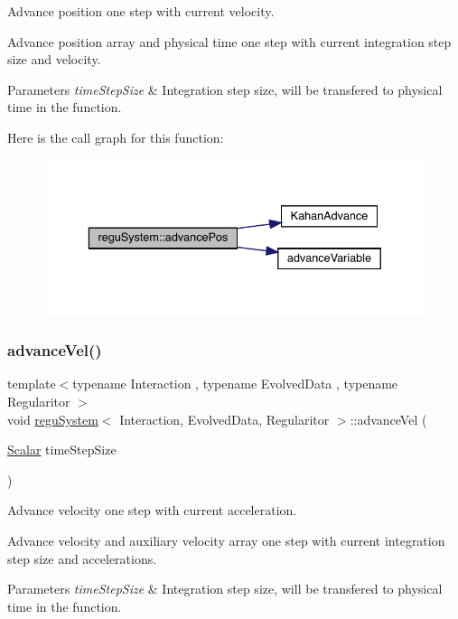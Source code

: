 Advance position one step with current velocity. 

Advance position array and physical time one step with current integration step size and velocity. 
\begin{DoxyParams}{Parameters}
{\em time\+Step\+Size} & Integration step size, will be transfered to physical time in the function. \\
\hline
\end{DoxyParams}
Here is the call graph for this function\+:
\nopagebreak
\begin{figure}[H]
\begin{center}
\leavevmode
\includegraphics[width=336pt]{classregu_system_ab1964e22d3d7f6ddaa51c5e7a02534a5_cgraph}
\end{center}
\end{figure}
\mbox{\label{classregu_system_ae00564e4aceeec7ce3a8aa6a158aa53e}} 
\subsubsection{\texorpdfstring{advance\+Vel()}{advanceVel()}}
{\footnotesize\ttfamily template$<$typename Interaction , typename Evolved\+Data , typename Regularitor $>$ \\
void \mbox{\hyperlink{classregu_system}{regu\+System}}$<$ Interaction, Evolved\+Data, Regularitor $>$\+::advance\+Vel (\begin{DoxyParamCaption}\item[{\mbox{\hyperlink{classregu_system_aca8ee2c387943164ee3ea68370fc3ac0}{Scalar}}}]{time\+Step\+Size }\end{DoxyParamCaption})}



Advance velocity one step with current acceleration. 

Advance velocity and auxiliary velocity array one step with current integration step size and accelerations. 
\begin{DoxyParams}{Parameters}
{\em time\+Step\+Size} & Integration step size, will be transfered to physical time in the function. \\
\hline
\end{DoxyParams}
\mbox{\label{classregu_system_a53e1d725a1df2b65029f622a17364b1e}} 
